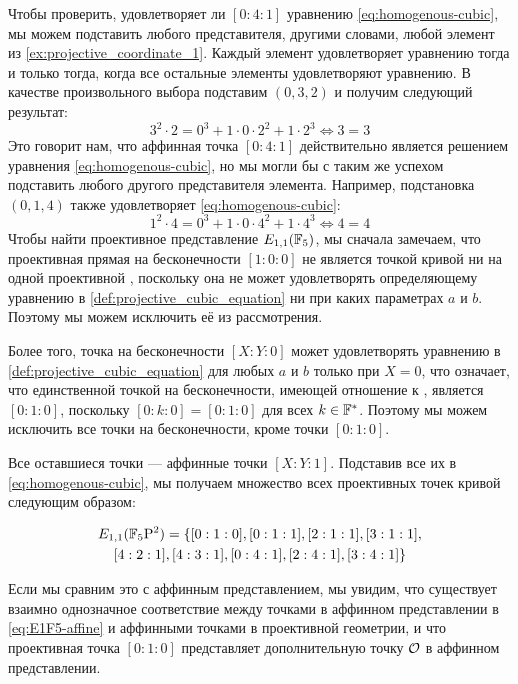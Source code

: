 \begin{example}
Чтобы проверить, удовлетворяет ли $[0:4:1]$ уравнению \eqref{eq:homogenous-cubic}, мы можем подставить любого представителя, другими словами, любой элемент из \eqref{ex:projective_coordinate_1}. Каждый элемент удовлетворяет уравнению тогда и только тогда, когда все остальные элементы удовлетворяют уравнению. В качестве произвольного выбора подставим $(0,3,2)$ и получим следующий результат:
$$
3^2\cdot 2 = 0^3 + 1\cdot 0\cdot 2^2 + 1\cdot 2^3 \Leftrightarrow
3 = 3
$$
Это говорит нам, что аффинная точка $[0:4:1]$ действительно является решением уравнения \eqref{eq:homogenous-cubic}, но мы могли бы с таким же успехом подставить любого другого представителя элемента. Например, подстановка $(0,1,4)$ также удовлетворяет \eqref{eq:homogenous-cubic}: 
$$
1^2\cdot 4 = 0^3 + 1\cdot 0\cdot 4^2 + 1\cdot 4^3 \Leftrightarrow
4=4
$$
Чтобы найти проективное представление $E_{1,1}(\mathbb{F}_5)$, мы сначала замечаем, что проективная прямая на бесконечности $[1:0:0]$ не является точкой кривой ни на одной проективной , поскольку она не может удовлетворять определяющему уравнению в \eqref{def:projective_cubic_equation} ни при каких параметрах $a$ и $b$. Поэтому мы можем исключить её из рассмотрения. 

Более того, точка на бесконечности $[X:Y:0]$ может удовлетворять уравнению в \eqref{def:projective_cubic_equation} для любых $a$ и $b$ только при $X=0$, что означает, что единственной точкой на бесконечности, имеющей отношение к , является $[0:1:0]$, поскольку $[0:k:0]= [0:1:0]$ для всех $k\in\mathbb{F}^*$. Поэтому мы можем исключить все точки на бесконечности, кроме точки $[0:1:0]$.

Все оставшиеся точки — аффинные точки $[X:Y:1]$. Подставив все их в \eqref{eq:homogenous-cubic}, мы получаем множество всех проективных точек кривой следующим образом:

\begin{multline}
\label{E1F5_projective_points_set}
E_{1,1}(\mathbb{F}_5\mathrm{P}^2)=\{[0:1:0], [0:1:1], [2:1:1], [3:1:1], \\ [4:2:1], [4:3:1], [0:4:1], [2:4:1], [3:4:1]\}
\end{multline}

Если мы сравним это с аффинным представлением, мы увидим, что существует взаимно однозначное соответствие между точками в аффинном представлении в \eqref{eq:E1F5-affine} и аффинными точками в проективной геометрии, и что проективная точка $[0:1:0]$ представляет дополнительную точку $\mathcal{O}$ в аффинном представлении.
\end{example} 


